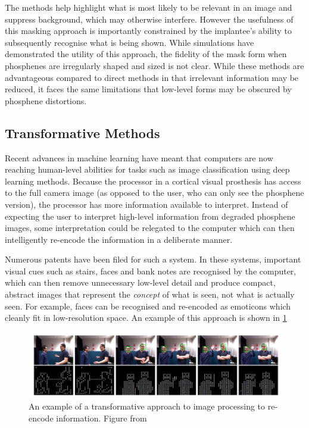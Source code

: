 \documentclass[a4paper,11pt,openany]{book}
\begin{document}
The methods help highlight what is most likely to be relevant in an image and suppress background, which may otherwise interfere.
However the usefulness of this masking approach is importantly constrained by the implantee's ability to subsequently recognise what is being shown.
While simulations have demonstrated the utility of this approach, the fidelity of the mask form when phosphenes are irregularly shaped and sized is not clear.
While these methods are advantageous compared to direct methods in that irrelevant information may be reduced, it faces the same limitations that low-level forms may be obscured by phosphene distortions.

\subsection*{Transformative Methods}
\label{sec:orga5df359}

Recent advances in machine learning have meant that computers are now reaching human-level abilities for tasks such as image classification using deep learning methods. \cite{rawat_deep_2017,guo_deep_2016}
Because the processor in a cortical visual prosthesis has access to the full camera image (as opposed to the user, who can only see the phosphene version), the processor has more information available to interpret.
Instead of expecting the user to interpret high-level information from degraded phosphene images, some interpretation could be relegated to the computer which can then intelligently re-encode the information in a deliberate manner.

Numerous patents have been filed for such a system. \cite{chichilnisky_eduardo-jose_smart_2018,li_going_2013}
In these systems, important visual cues such as stairs, faces and bank notes are recognised by the computer, which can then remove unnecessary low-level detail and produce compact, abstract images that represent the \emph{concept} of what is seen, not what is actually seen.
For example, faces can be recognised and re-encoded as emoticons which cleanly fit in low-resolution space. \cite{lui_transformative_2012}
An example of this approach is shown in \ref{fig:org39721af}

\begin{figure}[htbp]
\centering
\includegraphics[width=.9\linewidth]{./graphics/litreview/transformative.png}
\caption{\label{fig:org39721af}
An example of a transformative approach to image processing to re-encode information. Figure from \cite{lui_transformative_2012}}
\end{figure}
\end{document}
